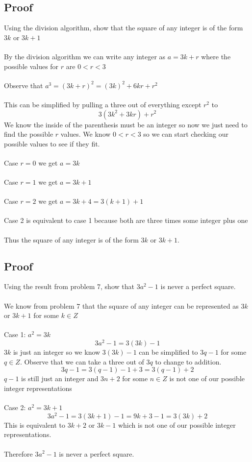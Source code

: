 \documentclass{article}
\begin{document}
\subsection{Proof}
Using the division algorithm, show that the square of any integer is of the form $3k$ or $3k+1$
\\\\
By the division algorithm we can write any integer as $a = 3k + r$ where the possible values for $r$ are $0 < r < 3$\\\\
Observe that $a^3 = (3k + r)^2 = (3k)^2 + 6kr + r^2$\\\\
This can be simplified by pulling a three out of everything except $r^2$ to $$3(3k^2+3kr) + r^2$$
We know the inside of the parenthesis must be an integer so now we just need to find the possible $r$ values. We know $0 < r < 3$ so we can start checking our possible values to see if they fit. 
\\\\
Case $r=0$ we get $a=3k$
\\\\
Case $r=1$ we get $a=3k+1$
\\\\
Case $r=2$ we get $a=3k+4=3(k + 1) + 1$ 
\\\\
Case 2 is equivalent to case 1 because both are three times some integer plus one
\\\\
Thus the square of any integer is of the form $3k$ or $3k+1$.

\subsection{Proof}
Using the result from problem 7, show that $3a^2 - 1$ is never a perfect square.
\\\\
We know from problem 7 that the square of any integer can be represented as $3k$ or $3k+1$ for some $k \in Z$
\\\\
Case 1: $a^2 = 3k$
$$3a^2 - 1 = 3(3k) - 1$$
$3k$ is just an integer so we know $3(3k) - 1$ can be simplified to $3q - 1$ for some $q \in Z$. Observe that we can take a three out of $3q$ to change to addition.
$$3q - 1 = 3(q - 1) - 1 + 3 = 3(q - 1) + 2$$
$q - 1$ is still just an integer and $3n + 2$ for some $n \in Z$ is not one of our possible integer representations
\\\\
Case 2: $a^2 = 3k+1$
$$3a^2 - 1 = 3(3k+1) - 1 = 9k+3-1=3(3k) +2$$
This is equivalent to $3k + 2$ or $3k-1$ which is not one of our possible integer representations.\\\\
Therefore $3a^2 - 1$ is never a perfect square.
\end{document}
